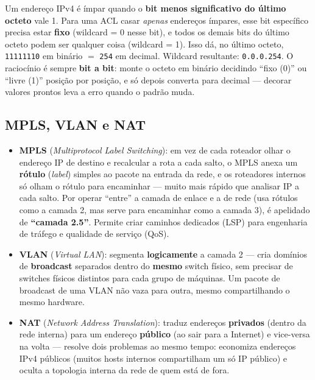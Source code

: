 \begin{exemplo}
Um endereço IPv4 é ímpar quando o \textbf{bit menos significativo do último
octeto} vale 1. Para uma ACL casar \emph{apenas} endereços ímpares, esse
bit específico precisa estar \textbf{fixo} (wildcard = 0 nesse bit), e
todos os demais bits do último octeto podem ser qualquer coisa (wildcard =
1). Isso dá, no último octeto, \texttt{11111110} em binário $=$
\texttt{254} em decimal. Wildcard resultante: \texttt{0.0.0.254}. O
raciocínio é sempre \textbf{bit a bit}: monte o octeto em binário decidindo
“fixo (0)” ou “livre (1)” posição por posição, e só depois converta para
decimal --- decorar valores prontos leva a erro quando o padrão muda.
\end{exemplo}

\subsection{MPLS, VLAN e NAT}

\begin{conceito}
\begin{itemize}
\item \textbf{MPLS} (\textit{Multiprotocol Label Switching}): em vez de
cada roteador olhar o endereço IP de destino e recalcular a rota a cada
salto, o MPLS anexa um \textbf{rótulo} (\textit{label}) simples ao pacote
na entrada da rede, e os roteadores internos só olham o rótulo para
encaminhar --- muito mais rápido que analisar IP a cada salto. Por operar
“entre” a camada de enlace e a de rede (usa rótulos como a camada 2, mas
serve para encaminhar como a camada 3), é apelidado de \textbf{“camada
2.5”}. Permite criar caminhos dedicados (LSP) para engenharia de tráfego e
qualidade de serviço (QoS).
\item \textbf{VLAN} (\textit{Virtual LAN}): segmenta \textbf{logicamente} a
camada 2 --- cria domínios de \textbf{broadcast} separados dentro do
\textbf{mesmo} switch físico, sem precisar de switches físicos distintos
para cada grupo de máquinas. Um pacote de broadcast de uma VLAN não vaza
para outra, mesmo compartilhando o mesmo hardware.
\item \textbf{NAT} (\textit{Network Address Translation}): traduz
endereços \textbf{privados} (dentro da rede interna) para um endereço
\textbf{público} (ao sair para a Internet) e vice-versa na volta ---
resolve dois problemas ao mesmo tempo: economiza endereços IPv4 públicos
(muitos hosts internos compartilham um só IP público) e oculta a topologia
interna da rede de quem está de fora.
\end{itemize}
\end{conceito}

